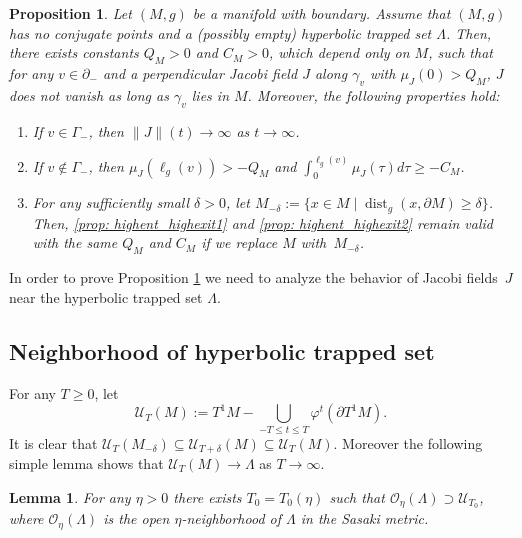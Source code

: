 \documentclass[10pt]{amsart}
\let\sep\mid
\newcommand{\elg}{\ell_g}
\DeclareMathOperator{\dist}{dist}
\newtheorem{lemma}[theorem]{Lemma}
\newtheorem{proposition}[theorem]{Proposition}
\theoremstyle{definition}
\let\phi\varphi
\renewcommand{\>}{{\rangle}}
\newcommand{\<}{{\langle}}
\begin{document}
\begin{proposition}\label{prop: highent_highexit}
Let $(M, g)$ be a manifold with boundary. Assume that $(M, g)$ has no conjugate points and a (possibly empty) hyperbolic trapped set $\Lambda$. Then, there exists constants $Q_M>0$ and $ C_M>0$, which depend only on $M$, such that for any $v\in\partial_-$ and a perpendicular Jacobi field $J$ along $\gamma_v$ with $\mu_J(0)>Q_M$, $J$ does not vanish as long as $\gamma_v$ lies in $M$. Moreover, the following properties hold:
\begin{enumerate}
\item\label{prop: highent_highexit1}
If $v\in \Gamma_-$, then $\|J\|(t)\to\infty$ as $t\to\infty$.

\item\label{prop: highent_highexit2}
If $v\notin \Gamma_-$, then $\mu_J(\elg(v))>-Q_M$ and $\int_0^{\elg(v)}\mu_J(\tau)d\tau\geq -C_M$.

\item\label{prop: highent_highexit3}
For any sufficiently small $\delta>0$, let $M_{-\delta}:=\{x\in M\sep \dist_g(x,\partial M)\geq \delta\}$. Then, \eqref{prop: highent_highexit1} and \eqref{prop: highent_highexit2} remain valid with the same $Q_M$ and $ C_M$ if we replace $M$ with~$M_{-\delta}$.
\end{enumerate}
\end{proposition}

In order to prove Proposition \ref{prop: highent_highexit} we need to analyze the behavior of Jacobi fields~$J$ near the hyperbolic trapped set $\Lambda$.

\subsection{Neighborhood of hyperbolic trapped set}
For any $T\geq 0$, let
\[
\mathcal U_T(M) := T^1M-\bigcup_{-T\leq t\leq T}\phi^t(\partial T^1M).
\]
It is clear that $\mathcal U_T(M_{-\delta})\subseteq \mathcal U_{T+\delta}(M)\subseteq \mathcal U_{T}(M)$. Moreover the following simple lemma shows that $\mathcal U_T(M)\to\Lambda$ as $T\to \infty$.

\begin{lemma}\label{lemma_nbh_of_trapping_set}
For any $\eta>0$ there exists $T_0=T_0(\eta)$ such that $\mathcal O_{\eta}(\Lambda)\supset\mathcal U_{T_0}$, where $\mathcal O_{\eta}(\Lambda)$ is the open $\eta$-neighborhood of $\Lambda$ in the Sasaki metric.
\end{lemma}
\end{document}
